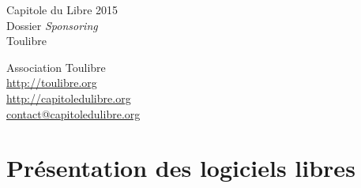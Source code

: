 \documentclass{cdl_sponsor}
\begin{document}
\thispagestyle{empty} %


\colorbox{Cdl}{
	\parbox[t]{1.0\linewidth}{
		\centering \fontsize{50pt}{80pt}\selectfont %
		\vspace*{0.7cm} %
		
		\hfill Capitole du Libre 2015		\\
		\hfill Dossier \textit{Sponsoring}  \\
		\hfill Toulibre  					\\\par
		
		\vspace*{0.7cm} %
	}
}


\vfill %

{\centering \large 
\hfill Association Toulibre \\
\hfill \url{http://toulibre.org} \\
\hfill \url{http://capitoledulibre.org} \\
\hfill \url{contact@capitoledulibre.org} \\
}
\clearpage %

\section{Présentation des logiciels libres}

\end{document}
